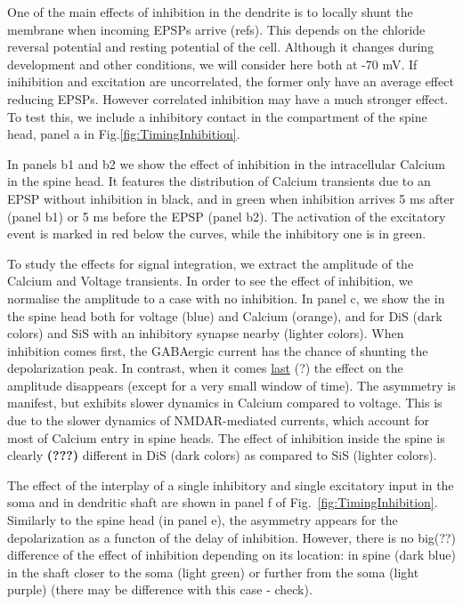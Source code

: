 \documentclass[10pt,letterpaper]{article}
\begin{document}
One of the main effects of inhibition in the dendrite is to locally shunt the membrane when incoming EPSPs arrive (refs). 
This depends on the chloride reversal potential and resting potential of the cell. Although it changes during development and other conditions, we will consider here both at -70 mV. If inihibition and excitation are uncorrelated, the former only have an average effect reducing EPSPs. However correlated inhibition may have a much stronger effect. To test this, we include a inhibitory contact in the compartment of the spine head, panel a in Fig.\ref{fig:TimingInhibition}. 


In panels b1 and b2 we show the effect of inhibition in the intracellular Calcium in the spine head. It features the distribution of Calcium transients due to an EPSP without inhibition in black, and in green when inhibition arrives 5 ms after (panel b1) or 5 ms before the EPSP (panel b2). The activation of the excitatory event is marked in red  below the curves, while the inhibitory one is in green.

To study the effects for signal integration, we extract the amplitude of the Calcium and Voltage transients. In order to see the effect of inhibition, we normalise the amplitude to a case with no inhibition. In panel c, we show the  in the spine head both for voltage (blue) and Calcium (orange), and for DiS (dark colors) and SiS with an inhibitory synapse nearby (lighter colors). When inhibition comes first, the GABAergic current has the chance of shunting the depolarization peak. In contrast, when it comes \underline{last} (?) the effect on the amplitude disappears (except for a very small window of time). The asymmetry is manifest, but exhibits slower dynamics in Calcium compared to voltage. This is due to the slower dynamics of NMDAR-mediated currents, which account for most of  Calcium entry in spine heads. The effect of inhibition inside the spine is clearly \textbf{(???)} different in DiS (dark colors) as compared to SiS (lighter colors). 

The effect of the interplay of a single inhibitory and single excitatory input in the soma and in dendritic shaft are shown in panel f of Fig.~\ref{fig:TimingInhibition}. Similarly to the spine head (in panel e), the asymmetry appears for the depolarization as a functon of the delay of inhibition. However, there is no big(??) difference of the effect of inhibition depending on its location: in spine (dark blue) in the shaft closer to the soma (light green) or further from the soma   (light purple) (there may be difference with this case - check). 
\end{document}
